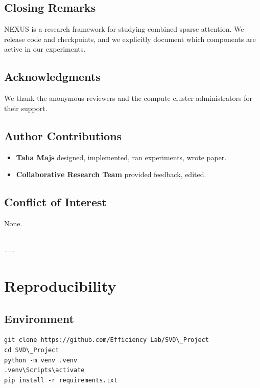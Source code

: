 \subsection{Closing Remarks}

NEXUS is a research framework for studying combined sparse attention. We 
release code and checkpoints, and we explicitly document which components 
are active in our experiments.

\subsection{Acknowledgments}

We thank the anonymous reviewers and the compute cluster administrators for their support.

\subsection{Author Contributions}

\begin{itemize}
\item \textbf{Taha Majs} designed, implemented, ran experiments, wrote paper.
\item \textbf{Collaborative Research Team} provided feedback, edited.

\end{itemize}
\subsection{Conflict of Interest}

None.
\begin{lstlisting}

---
\end{lstlisting}

\section{Reproducibility}

\subsection{Environment}

\begin{lstlisting}
git clone https://github.com/Efficiency Lab/SVD\_Project
cd SVD\_Project
python -m venv .venv
.venv\Scripts\activate
pip install -r requirements.txt
\end{lstlisting}

